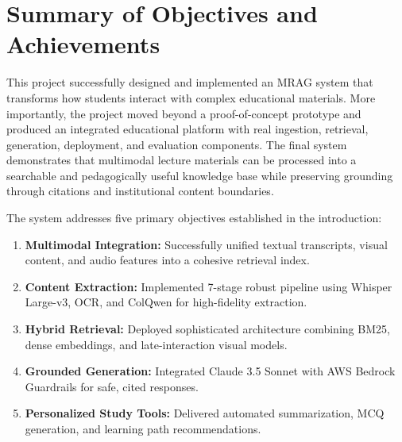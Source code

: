 % 
% 
\section{Summary of Objectives and Achievements}

This project successfully designed and implemented an MRAG system that transforms how students interact with complex educational materials. More importantly, the project moved beyond a proof-of-concept prototype and produced an integrated educational platform with real ingestion, retrieval, generation, deployment, and evaluation components. The final system demonstrates that multimodal lecture materials can be processed into a searchable and pedagogically useful knowledge base while preserving grounding through citations and institutional content boundaries.

The system addresses five primary objectives established in the introduction:

\begin{enumerate}
    \item \textbf{Multimodal Integration:} Successfully unified textual transcripts, visual content, and audio features into a cohesive retrieval index.
    \item \textbf{Content Extraction:} Implemented 7-stage robust pipeline using Whisper Large-v3, OCR, and ColQwen for high-fidelity extraction.
    \item \textbf{Hybrid Retrieval:} Deployed sophisticated architecture combining BM25, dense embeddings, and late-interaction visual models.
    \item \textbf{Grounded Generation:} Integrated Claude 3.5 Sonnet with AWS Bedrock Guardrails for safe, cited responses.
    \item \textbf{Personalized Study Tools:} Delivered automated summarization, MCQ generation, and learning path recommendations.
\end{enumerate}

